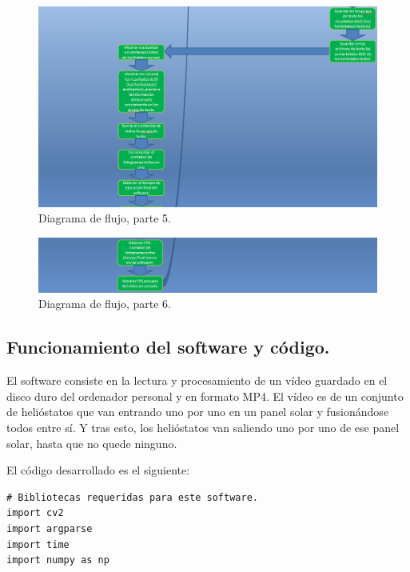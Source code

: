 \begin{figure}[h!]
  	\centering
	\includegraphics[width=\textwidth]{DiagramaFlujoSoftwareTFG/diagramaFlujo5.PNG}
	\caption{Diagrama de flujo, parte 5.
	\label{fig:DiagramaFlujoSoftwareTFG/diagramaFlujo5.PNG}}
\end{figure}

\begin{figure}[h!]
  	\centering
	\includegraphics[width=\textwidth]{DiagramaFlujoSoftwareTFG/diagramaFlujo6.PNG}
	\caption{Diagrama de flujo, parte 6.
	\label{fig:DiagramaFlujoSoftwareTFG/diagramaFlujo6.PNG}}
\end{figure}

\subsection{Funcionamiento del software y código.}

El software consiste en la lectura y procesamiento de un vídeo guardado en el disco duro del ordenador personal y en formato MP4. El vídeo es de un conjunto de helióstatos que van entrando uno por uno en un panel solar y fusionándose todos entre sí. Y tras esto, los helióstatos van saliendo uno por uno de ese panel solar, hasta que no quede ninguno.

El código desarrollado es el siguiente:\\[20pt]

\begin{lstlisting}
# Bibliotecas requeridas para este software.
import cv2
import argparse
import time
import numpy as np
\end{lstlisting}

